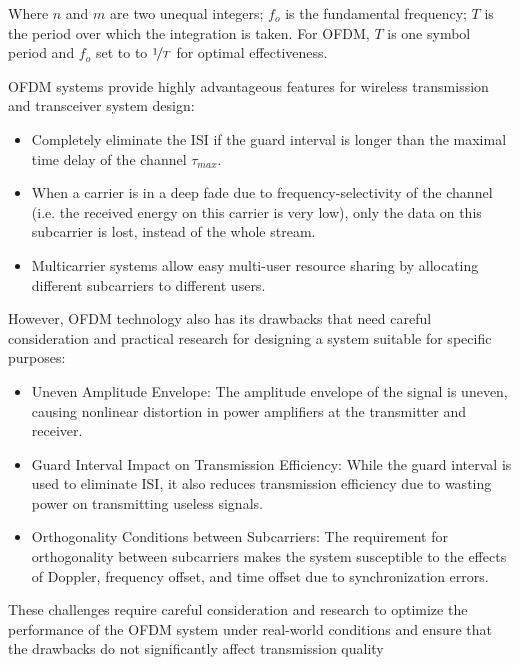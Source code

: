 Where $n$ and $m$ are two unequal integers; $f_o$ is the fundamental frequency; $T$ is the period over which the integration is taken. For OFDM, $T$ is one symbol period and $f_o$ set to to $\nicefrac{1}{T}$ for optimal effectiveness.

OFDM systems provide highly advantageous features for wireless transmission and transceiver system design:

\begin{itemize}
    \item Completely eliminate the ISI if the guard interval is longer than the maximal time delay of the channel $\tau_{max}$.
    \item When a carrier is in a deep fade due to frequency-selectivity of the channel (i.e. the received energy on this carrier is very low), only the data on this subcarrier is lost, instead of the whole stream.
    \item Multicarrier systems allow easy multi-user resource sharing by allocating different subcarriers to different users.
\end{itemize}
However, OFDM technology also has its drawbacks that need careful consideration and practical research for designing a system suitable for specific purposes:
\begin{itemize}
    \item Uneven Amplitude Envelope: The amplitude envelope of the signal is uneven, causing nonlinear distortion in power amplifiers at the transmitter and receiver.
    \item Guard Interval Impact on Transmission Efficiency: While the guard interval is used to eliminate ISI, it also reduces transmission efficiency due to wasting power on transmitting useless signals.
    \item Orthogonality Conditions between Subcarriers: The requirement for orthogonality between subcarriers makes the system susceptible to the effects of Doppler, frequency offset, and time offset due to synchronization errors.
\end{itemize}
These challenges require careful consideration and research to optimize the performance of the OFDM system under real-world conditions and ensure that the drawbacks do not significantly affect transmission quality

